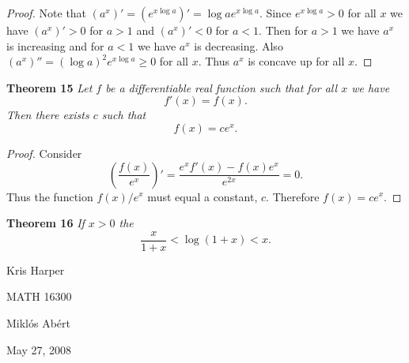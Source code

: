 \documentclass{article}
\begin{document}
\begin{flushleft}
\begin{proof}
Note that $(a^x)' = (e^{x \log a})' = \log a e^{x \log a}$. Since $e^{x \log a} > 0$ for all $x$ we have $(a^x)' > 0$ for $a > 1$ and $(a^x)' < 0$ for $a < 1$. Then for $a > 1$ we have $a^x$ is increasing and for $a < 1$ we have $a^x$ is decreasing. Also $(a^x)'' = (\log a)^2 e^{x \log a} \geq 0$ for all $x$. Thus $a^x$ is concave up for all $x$.
\end{proof}

\textbf{Theorem 15}
\textsl{Let $f$ be a differentiable real function such that for all $x$ we have
\[
f'(x) = f(x).
\]
Then there exists $c$ such that
\[
f(x) = c e^x.
\]}
\begin{proof}
Consider
\[
\left ( \frac{f(x)}{e^x} \right )' = \frac{e^x f'(x) - f(x) e^x}{e^{2x}} = 0.
\]
Thus the function $f(x)/e^x$ must equal a constant, $c$. Therefore $f(x) = c e^x$.
\end{proof}

\textbf{Theorem 16}
\textsl{If $x>0$ the
\[
\frac{x}{1+x} < \log (1+x) < x.
\]}

\end{flushleft}

\newpage

\begin{flushright}
Kris Harper

MATH 16300

Mikl\'{o}s Ab\'{e}rt

May 27, 2008
\end{flushright}
\end{document}
